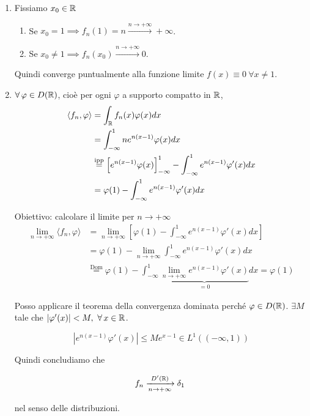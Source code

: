 \begin{enumerate}
\item Fissiamo $x_{0} \in \mathbb{R} $
\begin{enumerate}
\item Se $x_{0} = 1\implies f_{n}(1) = n\xrightarrow{n\rightarrow + \infty } + \infty $.
\item Se $x_{0} \neq 1\implies f_{n}(x_{0})\xrightarrow{n\rightarrow + \infty } 0$.
\end{enumerate}

Quindi converge puntualmente alla funzione limite $f(x) \equiv 0\ \forall x\neq 1$.
\item $\forall \varphi \in D(\RR)$, cioè per ogni $\varphi $ a supporto compatto in $\mathbb{R} $,\begin{align*}
\langle f_{n} ,\varphi \rangle  & = \int _{\mathbb{R} } f_{n}(x) \varphi (x) dx\\
 & = \int ^{1}_{ - \infty } ne^{n(x - 1)} \varphi (x) dx\\
 & \overset{\text{ipp}}{ = }\left[ e^{n(x - 1)} \varphi (x)\right]^{1}_{ - \infty } - \int ^{1}_{ - \infty } e^{n(x - 1)} \varphi '(x) dx\\
 & = \varphi (1) - \int ^{1}_{ - \infty } e^{n(x - 1)} \varphi '(x) dx
\end{align*}

Obiettivo: calcolare il limite per $n\rightarrow + \infty $\begin{align*}
\lim\limits _{n\rightarrow + \infty } \langle f_{n} ,\varphi \rangle  & = \lim\limits _{n\rightarrow + \infty }\left[ \varphi (1) - \int ^{1}_{ - \infty } e^{n(x - 1)} \varphi '(x) dx\right]\\
 & = \varphi (1) - \lim\limits _{n\rightarrow + \infty }\int ^{1}_{ - \infty } e^{n(x - 1)} \varphi '(x) dx\\
 & \overset{\text{Dom}}{ = } \varphi (1) - \int ^{1}_{ - \infty }\underbrace{\lim\limits _{n\rightarrow + \infty } e^{n(x - 1)} \varphi '(x)}_{ = 0} dx = \varphi (1)
\end{align*}

Posso applicare il teorema della convergenza dominata perché $\varphi \in D(\mathbb{R})$. $\exists M$ tale che $| \varphi '(x)| < M,\ \forall x\in \RR $.

\begin{equation*}
\left| e^{n(x - 1)} \varphi '(x)\right| \leqslant Me^{x - 1} \in L^{1}((- \infty ,1))
\end{equation*}

Quindi concludiamo che

\begin{equation*}
f_{n}\xrightarrow[n\rightarrow + \infty ]{D'(\mathbb{R})} \delta _{1} \ 
\end{equation*}

nel senso delle distribuzioni.
\end{enumerate}
